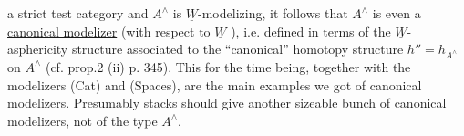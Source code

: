 \documentclass[10pt,oneside]{book}
\begin{document}
a strict test category and $A^\wedge$ is $\underline{W}$-modelizing,  it follows that $A^\wedge$ is
even a \uline{canonical modelizer} (with respect to $\underline{W}$ ),  i.e.  defined in
terms of the $\underline{W}$-asphericity structure associated to the ``canonical''
homotopy structure $h'' = h_{A^\wedge}$ on $A^\wedge$ (cf. prop.2  (ii)  p. 345).  This
for the time being,  together with the modelizers (Cat) and (Spaces),
are the main examples we got of canonical modelizers.  Presumably
stacks should give another sizeable bunch of canonical modelizers,
not of the type $A^\wedge$.

\begin{center}\shortstack{*\qquad *\\{}*}\end{center}
\end{document}
